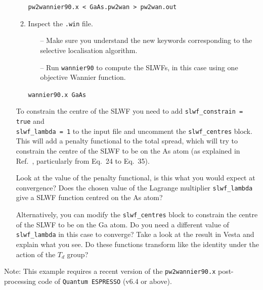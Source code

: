 \documentclass[a4paper,11pt,twoside]{article}
\begin{document}
\begin{itemize}
\begin{enumerate}
\begin{itemize}
\end{itemize}


\verb|pw2wannier90.x < GaAs.pw2wan > pw2wan.out|

\item Inspect the {\tt .win} file.

\begin{itemize}
\item[--] Make sure you understand the new keywords corresponding to the selective localisation algorithm. 
\item[--] Run {\tt wannier90} to compute the SLWFs, in this case using one objective Wannier function. 

\end{itemize}


\verb|wannier90.x GaAs|

\end{enumerate}

To constrain the centre of the SLWF you need to add \mbox{{\tt slwf\_constrain = true}} and \\ 
\mbox{{\tt slwf\_lambda = 1}} to the input file and uncomment the \mbox{{\tt slwf\_centres}} block. This will add a penalty functional to the total spread, which will try to constrain the centre of the SLWF to be on the As atom (as explained in Ref.~\cite{Marianetti}, particularly from Eq.~24 to Eq.~35).  

Look at the value of the penalty functional, is this what you would expect at convergence? 
Does the chosen value of the Lagrange multiplier {\tt slwf\_lambda} give a SLWF function centred on the As atom?   

Alternatively, you can modify the {\tt slwf\_centres} block to constrain the centre of the SLWF to be on the Ga atom. 
Do you need a different value of {\tt slwf\_lambda} in this case to converge?
Take a look at the result in Vesta and explain what you see. Do these functions transform like the identity under the action of the $T_d$ group? 


\end{itemize}


Note: This example requires a recent version of the {\tt pw2wannier90.x} post-processing code of {\tt Quantum ESPRESSO} (v6.4 or above).
\end{document}
